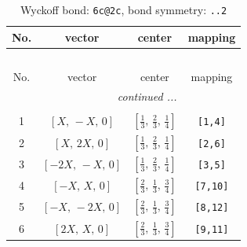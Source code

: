 \documentclass[fleqn,8pt]{jsarticle}
\begin{document}
\renewcommand{\arraystretch}{1.2}
\begin{longtable}{cccc}
\caption{Wyckoff bond: {\tt 6c@2c}, bond symmetry: {\tt ..2}}
 \\
 \hline \hline
No. & vector & center & mapping \\ \hline \endfirsthead

\multicolumn{3}{l}{\tablename\ \thetable{}} \\
 \hline \hline
No. & vector & center & mapping \\ \hline \endhead

 \hline \hline
\multicolumn{3}{r}{\footnotesize\it continued ...} \\ \endfoot

 \hline \hline
\multicolumn{3}{r}{} \\ \endlastfoot

1 & $\left[ X,\, - X,\, 0 \right]$ & $\left[ \frac{1}{3},\, \frac{2}{3},\, \frac{1}{4} \right]$ & {\tt [1,4]} \\ \hline
2 & $\left[ X,\, 2 X,\, 0 \right]$ & $\left[ \frac{1}{3},\, \frac{2}{3},\, \frac{1}{4} \right]$ & {\tt [2,6]} \\ \hline
3 & $\left[ - 2 X,\, - X,\, 0 \right]$ & $\left[ \frac{1}{3},\, \frac{2}{3},\, \frac{1}{4} \right]$ & {\tt [3,5]} \\ \hline
4 & $\left[ - X,\, X,\, 0 \right]$ & $\left[ \frac{2}{3},\, \frac{1}{3},\, \frac{3}{4} \right]$ & {\tt [7,10]} \\ \hline
5 & $\left[ - X,\, - 2 X,\, 0 \right]$ & $\left[ \frac{2}{3},\, \frac{1}{3},\, \frac{3}{4} \right]$ & {\tt [8,12]} \\ \hline
6 & $\left[ 2 X,\, X,\, 0 \right]$ & $\left[ \frac{2}{3},\, \frac{1}{3},\, \frac{3}{4} \right]$ & {\tt [9,11]} \\
\end{longtable}
\renewcommand{\arraystretch}{1.2}
\end{document}

